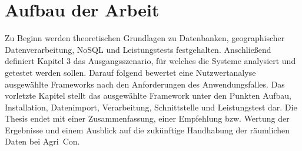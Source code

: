\section{Aufbau der Arbeit}


Zu Beginn werden theoretischen Grundlagen zu Datenbanken, geographischer Datenverarbeitung, NoSQL und Leistungstests festgehalten.
Anschließend definiert Kapitel 3 das Ausgangsszenario, für welches die Systeme analysiert und getestet werden sollen.
Darauf folgend bewertet eine Nutzwertanalyse ausgewählte Frameworks nach den Anforderungen des Anwendungsfalles.
Das vorletzte Kapitel stellt das ausgewählte Framework unter den Punkten Aufbau, Installation, Datenimport, Verarbeitung, Schnittstelle und Leistungstest dar.
Die Thesis endet mit einer Zusammenfassung, einer Empfehlung bzw. Wertung der Ergebnisse und einem Ausblick auf die zukünftige Handhabung der räumlichen Daten bei Agri~Con.